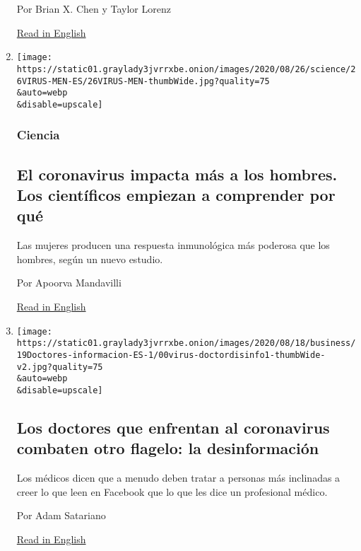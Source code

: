 \begin{enumerate}
  Por Brian X. Chen y Taylor Lorenz

  \href{https://www.nytimes3xbfgragh.onion/2020/08/12/technology/personaltech/tested-facebook-reels-tiktok-clone-dud.html}{Read
  in English}
\item
  \href{/es/2020/08/26/espanol/ciencia-y-tecnologia/coronavirus-afecta-hombres.html}{}

  \texttt{[image: https://static01.graylady3jvrrxbe.onion/images/2020/08/26/science/26VIRUS-MEN-ES/26VIRUS-MEN-thumbWide.jpg?quality=75\\\&auto=webp\\\&disable=upscale]}

  \hypertarget{ciencia-1}{%
  \subsubsection{Ciencia}\label{ciencia-1}}

  \hypertarget{el-coronavirus-impacta-muxe1s-a-los-hombres-los-cientuxedficos-empiezan-a-comprender-por-quuxe9}{%
  \subsection{El coronavirus impacta más a los hombres. Los científicos
  empiezan a comprender por
  qué}\label{el-coronavirus-impacta-muxe1s-a-los-hombres-los-cientuxedficos-empiezan-a-comprender-por-quuxe9}}

  Las mujeres producen una respuesta inmunológica más poderosa que los
  hombres, según un nuevo estudio.

  Por Apoorva Mandavilli

  \href{https://www.nytimes3xbfgragh.onion/2020/08/26/health/coronavirus-men-immune.html}{Read
  in English}
\item
  \href{/es/2020/08/20/espanol/ciencia-y-tecnologia/desinformacion-coronavirus.html}{}

  \texttt{[image: https://static01.graylady3jvrrxbe.onion/images/2020/08/18/business/19Doctores-informacion-ES-1/00virus-doctordisinfo1-thumbWide-v2.jpg?quality=75\\\&auto=webp\\\&disable=upscale]}

  \hypertarget{los-doctores-que-enfrentan-al-coronavirus-combaten-otro-flagelo-la-desinformaciuxf3n}{%
  \subsection{Los doctores que enfrentan al coronavirus combaten otro
  flagelo: la
  desinformación}\label{los-doctores-que-enfrentan-al-coronavirus-combaten-otro-flagelo-la-desinformaciuxf3n}}

  Los médicos dicen que a menudo deben tratar a personas más inclinadas
  a creer lo que leen en Facebook que lo que les dice un profesional
  médico.

  Por Adam Satariano

  \href{https://www.nytimes3xbfgragh.onion/2020/08/17/technology/coronavirus-disinformation-doctors.html}{Read
  in English}
\end{enumerate}

